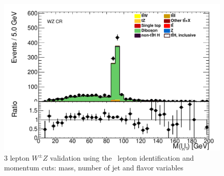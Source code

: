 \begin{figure}[!htbp]
\begin{minipage}[h]{0.5\textwidth}
  \end{minipage}\hfill
  \begin{minipage}[h]{0.5\textwidth}
    \centering \includegraphics[width=\textwidth]{figs/WZ/standardCR_3l_WZ_MT_Mll01_thesis}
  \end{minipage}\hfill

\caption{3 lepton $W^{\pm}Z$ validation using the \tth\ lepton identification and momentum cuts: mass, number of jet and flavor variables} 
\label{figure:background_wz_incl}
\end{figure} 




